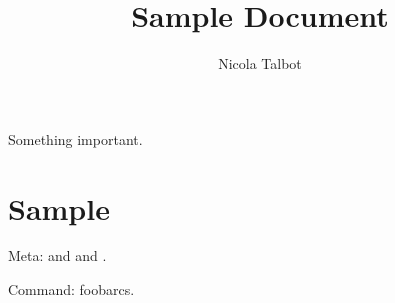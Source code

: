 \documentclass[titlepage=false,index=totoc,bibliography=totoc,
 fontsize=12pt,captions=tableheading]{scrreprt}
\title{Sample Document}
\author{Nicola Talbot}
\begin{document}
\maketitle

\begin{important}
Something important.
\end{important}

\frontmatter
\tableofcontents

\mainmatter
\chapter{Sample}

Meta:  and  and .

Command: \gls{foobarcs}.

\end{document}
